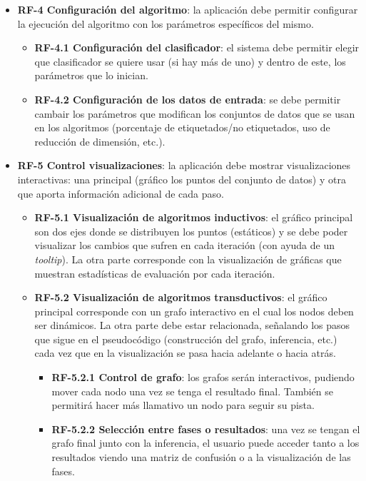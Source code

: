 \begin{itemize}
\begin{itemize}
\end{itemize}
	\item \textbf{RF-4 Configuración del algoritmo}: la aplicación debe	permitir configurar la ejecución del algoritmo con los parámetros específicos del mismo.
	\begin{itemize}
		\item \textbf{RF-4.1 Configuración del clasificador}: el sistema debe permitir elegir que clasificador se quiere usar (si hay más de uno) y dentro de este, los parámetros que lo inician.
		\item \textbf{RF-4.2 Configuración de los datos de entrada}: se debe permitir cambair los parámetros que modifican los conjuntos de datos que se usan en los algoritmos (porcentaje de etiquetados/no etiquetados, uso de reducción de dimensión, etc.).
	\end{itemize} 
	\item \textbf{RF-5 Control visualizaciones}: la aplicación debe mostrar visualizaciones interactivas: una principal (gráfico los puntos del conjunto de datos) y otra que aporta información adicional de cada paso.
	\begin{itemize}
		\item \textbf{RF-5.1 Visualización de algoritmos inductivos}: el gráfico principal son dos ejes donde se distribuyen los puntos (estáticos) y se debe poder visualizar los cambios que sufren en cada iteración (con ayuda de un \textit{tooltip}). La otra parte corresponde con la visualización de gráficas que muestran estadísticas de evaluación por cada iteración.
		\item \textbf{RF-5.2 Visualización de algoritmos transductivos}: el gráfico principal corresponde con un grafo interactivo en el cual los nodos deben ser dinámicos. La otra parte debe estar relacionada, señalando los pasos que sigue en el pseudocódigo (construcción del grafo, inferencia, etc.) cada vez que en la visualización se pasa hacia adelante o hacia atrás.
		\begin{itemize}
			\item \textbf{RF-5.2.1 Control de grafo}: los grafos serán interactivos, pudiendo mover cada nodo una vez se tenga el resultado final. También se permitirá hacer más llamativo un nodo para seguir su pista.
			\item \textbf{RF-5.2.2 Selección entre fases o resultados}: una vez se tengan el grafo final junto con la inferencia, el usuario puede acceder tanto a los resultados viendo una matriz de confusión o a la visualización de las fases.
		\end{itemize}

\end{itemize}
\end{itemize}
